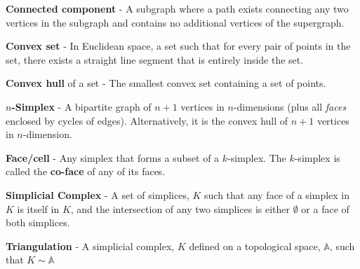 \begin{defn}
  \textbf{Connected component} - A subgraph where a path exists connecting
  any two vertices in the subgraph and contains no additional vertices of the
  supergraph.
\end{defn}

\begin{defn}
  \textbf{Convex set} - In Euclidean space, a set such that for every pair of
  points in the set, there exists a straight line segment that is entirely
  inside the set.
\end{defn}

\begin{defn}
  \textbf{Convex hull} of a set - The smallest convex set containing a set of
  points.
\end{defn}

\begin{defn}
  \textbf{$n$-Simplex} - A bipartite graph of $n+1$ vertices in $n$-dimensions
   (plus all \emph{faces} enclosed by cycles of edges).
  Alternatively, it is the convex hull of $n+1$ vertices in $n$-dimension.
\end{defn}

\begin{defn}
  \textbf{Face/cell} - Any simplex that forms a subset of a $k$-simplex.
  The $k$-simplex is called the \textbf{co-face} of any of its faces.
\end{defn}

\begin{defn}
  \textbf{Simplicial Complex} - A set of simplices, $K$ such that any face of
  a simplex in $K$ is itself in $K$, and the intersection of any two simplices
  is either $\emptyset$ or a face of both simplices.
\end{defn}

\begin{defn}
  \textbf{Triangulation} - A simplicial complex, $K$ defined on a topological
  space, $\mathbb{A}$, such that $K \sim \mathbb{A}$
\end{defn}


% 